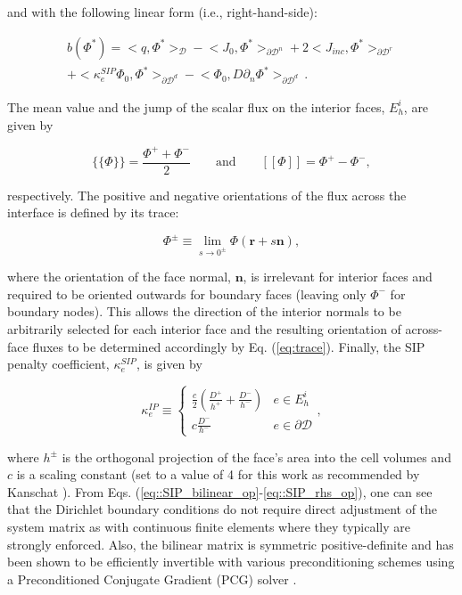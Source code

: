 \documentclass{anstrans}
\renewcommand{\vec}[1]{\bm{#1}} %
\begin{document}
\noindent and with the following linear form (i.e., right-hand-side):

\begin{equation}
\begin{aligned}
b(\Phi^*) = \Big<  q, \Phi^*  \Big>_{\mathcal{D}}  - \Big<   J_{0}, \Phi^*  \Big>_{\partial \mathcal{D}^n} +  2 \Big<   J_{inc}, \Phi^*  \Big>_{\partial \mathcal{D}^r} \\
 + \Big< \kappa_e^{SIP}   \Phi_0 ,   \Phi^* \Big>_{\partial \mathcal{D}^d} - \Big<   \Phi_0  ,  D \partial_n \Phi^* \Big>_{\partial \mathcal{D}^d}  \, .
\end{aligned}
\label{eq::SIP_rhs_op}
\end{equation}

The mean value and the jump of the scalar flux on the interior faces, $E_h^i$, are given by 

\begin{equation}
\{\!\{ \Phi \}\!\} = \frac{\Phi^{+} + \Phi^{-}}{2} \qquad \text{and} \qquad  [\![ \Phi ]\!] = \Phi^{+} - \Phi^{-},
\label{eq::mean_and_jump}
\end{equation}

\noindent respectively. The positive and negative orientations of the flux across the interface is defined by its trace:

\begin{equation}
\Phi^{\pm} \equiv \lim_{s \rightarrow 0^{\pm}} \Phi \left( \vec{r} + s \vec{n} \right),
\label{eq:trace}
\end{equation}

\noindent where the orientation of the face normal, $\vec{n}$, is irrelevant for interior faces and required to be oriented outwards for boundary faces (leaving only $\Phi^{-}$ for boundary nodes). This allows the direction of the interior normals to be arbitrarily selected for each interior face and the resulting orientation of across-face fluxes to be determined accordingly by Eq. (\ref{eq:trace}). Finally, the SIP penalty coefficient, $\kappa_e^{SIP}$, is given by

\begin{equation}
\kappa_e^{IP} \equiv 
\begin{cases}
\frac{c}{2} \left(  \frac{D^+}{h^+} + \frac{D^-}{h^-} \right) & e \in E_h^i\\ 
c \frac{D^-}{h^-}& e \in \partial \mathcal{D}
\end{cases},
\label{eq::SIP_penalty_term}
\end{equation}

\noindent where $h^{\pm}$ is the orthogonal projection of the face's area into the cell volumes and $c$ is a scaling constant (set to a value of 4 for this work as recommended by Kanschat \cite{kanschat2007discontinuous}).  From Eqs. (\ref{eq::SIP_bilinear_op}-\ref{eq::SIP_rhs_op}), one can see that the Dirichlet boundary conditions do not require direct adjustment of the system matrix as with continuous finite elements where they typically are strongly enforced. Also, the bilinear matrix is symmetric positive-definite and has been shown to be efficiently invertible with various preconditioning schemes using a Preconditioned Conjugate Gradient (PCG) solver \cite{ref::DSA_2D_arb_poly}.
\end{document}
